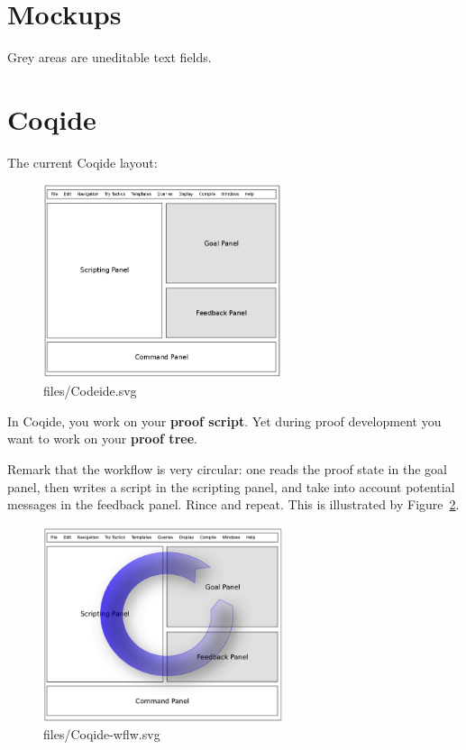 \documentclass[11pt,a4paper]{article}
\begin{document}
\newpage
\section*{Mockups}
\noindent
Grey areas are uneditable text fields. 


\section*{Coqide}
\noindent 
The current Coqide layout:

\begin{figure}[ht!]
  \centering
  \includegraphics[width=7cm]{files/coqide.png}
  \caption{files/Codeide.svg}
  \label{fig:1}
\end{figure}

In Coqide, you work on your {\bf proof script}. Yet during proof development
you want to work on your {\bf proof tree}.


Remark that the workflow is very circular: one reads the proof state
in the goal panel, then writes a script in the scripting panel, and
take into account potential messages in the feedback panel. Rince and
repeat. This is illustrated by Figure~\ref{fig:2}.

\begin{figure}[ht!]
  \centering
  \includegraphics[width=7cm]{files/Coqide-wflw.png}
  \caption{files/Coqide-wflw.svg}
  \label{fig:2}
\end{figure}
\end{document}
